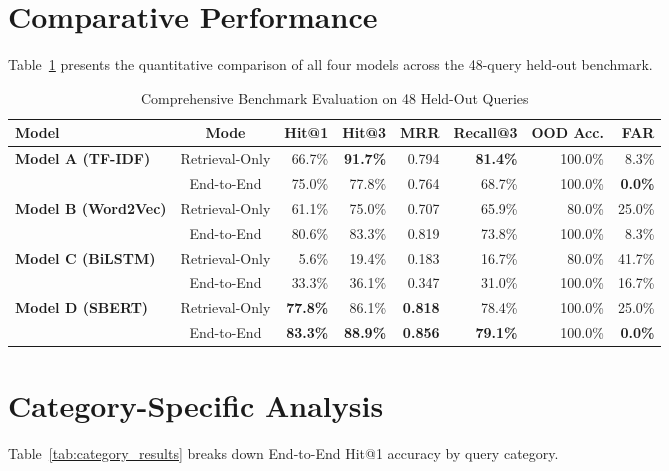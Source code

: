 \documentclass[12pt,a4paper]{report}
\begin{document}
\section{Comparative Performance}
Table~\ref{tab:comparison_results} presents the quantitative comparison of all four models across the 48-query held-out benchmark.

\begin{table}[H]
    \centering
    \caption{Comprehensive Benchmark Evaluation on 48 Held-Out Queries}
    \label{tab:comparison_results}
    \begin{tabularx}{\textwidth}{lcrrrrrr}
        \toprule
        \textbf{Model} & \textbf{Mode} & \textbf{Hit@1} & \textbf{Hit@3} & \textbf{MRR} & \textbf{Recall@3} & \textbf{OOD Acc.} & \textbf{FAR} \\
        \midrule
        \textbf{Model A (TF-IDF)} & Retrieval-Only & 66.7\% & \textbf{91.7\%} & 0.794 & \textbf{81.4\%} & 100.0\% & 8.3\% \\
        & End-to-End & 75.0\% & 77.8\% & 0.764 & 68.7\% & 100.0\% & \textbf{0.0\%} \\
        \midrule
        \textbf{Model B (Word2Vec)} & Retrieval-Only & 61.1\% & 75.0\% & 0.707 & 65.9\% & 80.0\% & 25.0\% \\
        & End-to-End & 80.6\% & 83.3\% & 0.819 & 73.8\% & 100.0\% & 8.3\% \\
        \midrule
        \textbf{Model C (BiLSTM)} & Retrieval-Only & 5.6\% & 19.4\% & 0.183 & 16.7\% & 80.0\% & 41.7\% \\
        & End-to-End & 33.3\% & 36.1\% & 0.347 & 31.0\% & 100.0\% & 16.7\% \\
        \midrule
        \textbf{Model D (SBERT)} & Retrieval-Only & \textbf{77.8\%} & 86.1\% & \textbf{0.818} & 78.4\% & 100.0\% & 25.0\% \\
        & End-to-End & \textbf{83.3\%} & \textbf{88.9\%} & \textbf{0.856} & \textbf{79.1\%} & 100.0\% & \textbf{0.0\%} \\
        \bottomrule
    \end{tabularx}
\end{table}

\section{Category-Specific Analysis}
Table~\ref{tab:category_results} breaks down End-to-End Hit@1 accuracy by query category.
\end{document}

